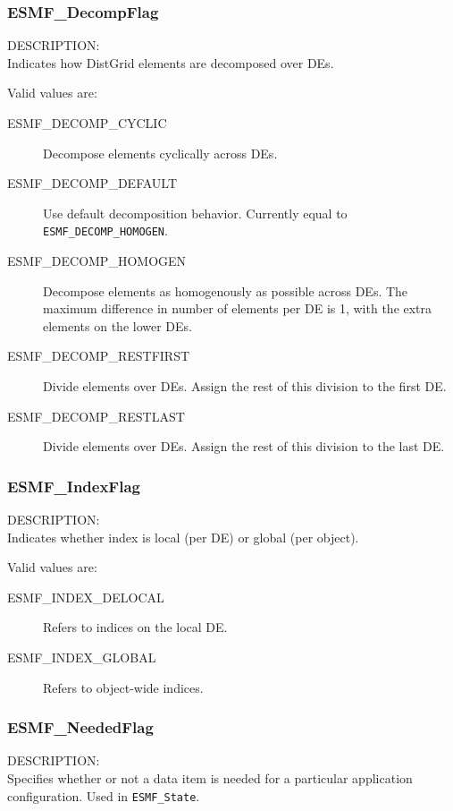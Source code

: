 \subsubsection{ESMF\_DecompFlag}
\label{opt:decompflag}
{\sf DESCRIPTION:\\}
Indicates how DistGrid elements are decomposed over DEs.

Valid values are:
\begin{description}
\item [ESMF\_DECOMP\_CYCLIC]
      Decompose elements cyclically across DEs.
\item [ESMF\_DECOMP\_DEFAULT]
      Use default decomposition behavior. Currently equal to 
      {\tt ESMF\_DECOMP\_HOMOGEN}.
\item [ESMF\_DECOMP\_HOMOGEN]
      Decompose elements as homogenously as possible across DEs. The maximum 
      difference in number of elements per DE is 1, with the extra elements on
      the lower DEs.
\item [ESMF\_DECOMP\_RESTFIRST]
      Divide elements over DEs. Assign the rest of this division to the first
      DE.
\item [ESMF\_DECOMP\_RESTLAST]
      Divide elements over DEs. Assign the rest of this division to the last DE.
\end{description}

\subsubsection{ESMF\_IndexFlag}
\label{opt:indexflag}
{\sf DESCRIPTION:\\}
Indicates whether index is local (per DE) or global (per object).

Valid values are:
\begin{description}
\item [ESMF\_INDEX\_DELOCAL]
      Refers to indices on the local DE.
\item [ESMF\_INDEX\_GLOBAL]
      Refers to object-wide indices.
\end{description}

\subsubsection{ESMF\_NeededFlag}
\label{opt:neededflag}
{\sf DESCRIPTION:\\}
Specifies whether or not a data item is needed for a 
particular application configuration.  Used in {\tt ESMF\_State}.

